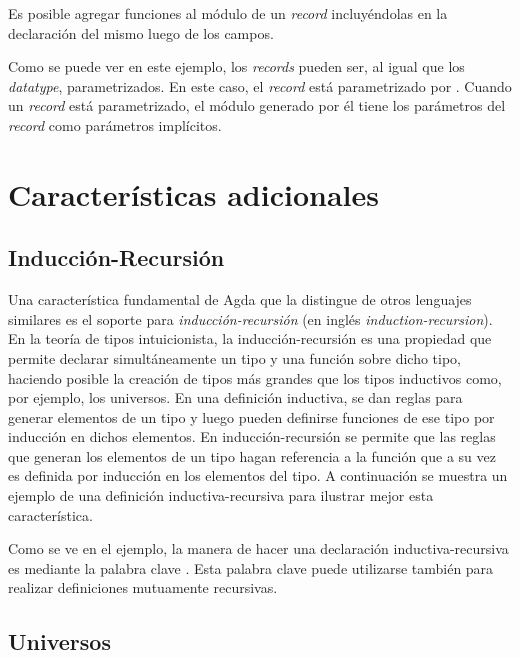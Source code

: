 Es posible agregar funciones al módulo de un \textit{record} incluyéndolas en la declaración del mismo luego de los campos. 


Como se puede ver en este ejemplo, los \textit{records} pueden ser, al igual que los \textit{datatype}, parametrizados. En este caso, el \textit{record}  está parametrizado por . Cuando un \textit{record} está parametrizado, el módulo generado por él tiene los parámetros del \textit{record} como parámetros implícitos.

\section{Características adicionales}\label{agda:additional}

\subsection{Inducción-Recursión}\label{additional:ind-rec}

Una característica fundamental de Agda que la distingue de otros lenguajes similares es el soporte para \textit{inducción-recursión} (en inglés \textit{induction-recursion}). En la teoría de tipos intuicionista, la inducción-recursión es una propiedad que permite declarar simultáneamente un tipo y una función sobre dicho tipo, haciendo posible la creación de tipos más grandes que los tipos inductivos como, por ejemplo, los universos. En una definición inductiva, se dan reglas para generar elementos de un tipo y luego pueden definirse funciones de ese tipo por inducción en dichos elementos. En inducción-recursión se permite que las reglas que generan los elementos de un tipo hagan referencia a la función que a su vez es definida por inducción en los elementos del tipo. A continuación se muestra un ejemplo de una definición inductiva-recursiva para ilustrar mejor esta característica. 


Como se ve en el ejemplo, la manera de hacer una declaración inductiva-recursiva es mediante la palabra clave . Esta palabra clave puede utilizarse también para realizar definiciones mutuamente recursivas. 


\subsection{Universos}\label{additional:univ}

